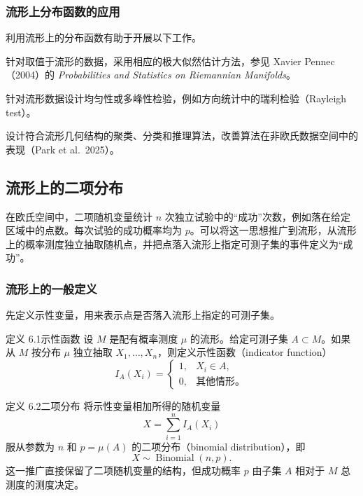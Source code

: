 \subsubsection{流形上分布函数的应用}

利用流形上的分布函数有助于开展以下工作。
\begin{description}[leftmargin=2em]
  \item[参数估计] 针对取值于流形的数据，采用相应的极大似然估计方法，参见 Xavier Pennec（2004）的 \emph{Probabilities and Statistics on Riemannian Manifolds}。
  \item[假设检验] 针对流形数据设计均匀性或多峰性检验，例如方向统计中的瑞利检验（Rayleigh test）。
  \item[机器学习算法] 设计符合流形几何结构的聚类、分类和推理算法，改善算法在非欧氏数据空间中的表现（Park et al.\ 2025）。
\end{description}

\subsection{流形上的二项分布}

在欧氏空间中，二项随机变量统计 $n$ 次独立试验中的“成功”次数，例如落在给定区域中的点数。每次试验的成功概率均为 $p$。可以将这一思想推广到流形，从流形上的概率测度独立抽取随机点，并把点落入流形上指定可测子集的事件定义为“成功”。

\subsubsection{流形上的一般定义}

先定义示性变量，用来表示点是否落入流形上指定的可测子集。

\begin{statement}{定义 6.1}{示性函数}
设 $M$ 是配有概率测度 $\mu$ 的流形。给定可测子集 $A\subset M$。如果从 $M$ 按分布 $\mu$ 独立抽取 $X_1,\ldots,X_n$，则定义示性函数（indicator function）
\[
  I_A(X_i)=
  \begin{cases}
    1,&X_i\in A,\\
    0,&\text{其他情形。}
  \end{cases}
\]
\end{statement}

\begin{statement}{定义 6.2}{二项分布}
将示性变量相加所得的随机变量
\[
  X=\sum_{i=1}^{n} I_A(X_i)
\]
服从参数为 $n$ 和 $p=\mu(A)$ 的二项分布（binomial distribution），即
\[
  X\sim\operatorname{Binomial}(n,p).
\]
这一推广直接保留了二项随机变量的结构，但成功概率 $p$ 由子集 $A$ 相对于 $M$ 总测度的测度决定。
\end{statement}

